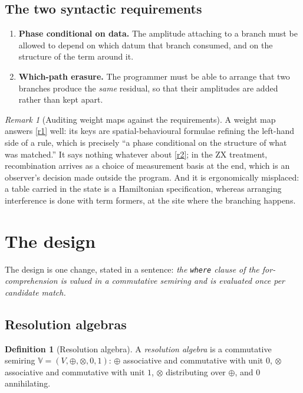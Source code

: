 \documentclass[11pt,a4paper]{article}
\theoremstyle{plain}
\theoremstyle{definition}
\newtheorem{definition}[theorem]{Definition}
\theoremstyle{remark}
\newtheorem{remark}[theorem]{Remark}
\newcommand{\V}{\mathbb{V}}
\newcommand{\tensorv}{\otimes}
\newcommand{\sumv}{\oplus}
\begin{document}
\subsection{The two syntactic requirements}

\begin{enumerate}[label=(R\arabic*),leftmargin=2.6em,itemsep=3pt]
\item \label{r1} \textbf{Phase conditional on data.} The amplitude attaching to a
branch must be allowed to depend on which datum that branch consumed, and on the
structure of the term around it.
\item \label{r2} \textbf{Which-path erasure.} The programmer must be able to
arrange that two branches produce the \emph{same} residual, so that their
amplitudes are added rather than kept apart.
\end{enumerate}

\begin{remark}[Auditing weight maps against the requirements]\label{rem:audit}
A weight map answers \ref{r1} well: its keys are spatial-behavioural formulae
refining the left-hand side of a rule, which is precisely ``a phase conditional
on the structure of what was matched.'' It says nothing whatever about \ref{r2};
in the ZX treatment, recombination arrives as a choice of measurement basis at
the end, which is an observer's decision made outside the program. And it is
ergonomically misplaced: a table carried in the state is a Hamiltonian
specification, whereas arranging interference is done with term formers, at the
site where the branching happens.
\end{remark}

\section{The design}\label{sec:design}

The design is one change, stated in a sentence: \emph{the \texttt{where} clause
of the for-comprehension is valued in a commutative semiring and is evaluated
once per candidate match.}

\subsection{Resolution algebras}

\begin{definition}[Resolution algebra]\label{def:algebra}
A \emph{resolution algebra} is a commutative semiring
$\V = (V, \sumv, \tensorv, 0, 1)$: $\sumv$ associative and commutative with unit
$0$, $\tensorv$ associative and commutative with unit $1$, $\tensorv$
distributing over $\sumv$, and $0$ annihilating.
\end{definition}
\end{document}
